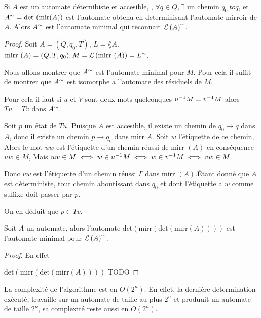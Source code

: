 \begin{prop}
	Si $A$ est un automate déternibiste et accesible, \ie, $\forall q \in Q, \exists \text{ un chemin } q_0 \ to q$,
	et  $A^{\sim} = \text {det } (\text {mir} (A)) $ est l'automate obtenu en determinisant l'automate mirroir de $A$. Alors
	$A^{\sim}$ est l'automate minimal qui reconnait $\mathcal{L}\left(A\right)^{\sim}$.
\end{prop}


\begin{proof}
	Soit $A = (Q, q_0, T)$, $L = \lang A$. $\text{mirr } (A) = (Q, T, q_0), M = \mathcal{L}\left(\text{mirr } (A)\right) = L^{\sim}$.

	Nous allons montrer que $A^{\sim}$ est l'automate minimal pour $M$. Pour cela il suffit de montrer que $A^{\sim}$
	est isomorphe a l'automate des résiduels de $M$.

	Pour cela il faut \mq si $u$ et $V$ sont deux mots quelconques \tq $u^{-1} M = v^{-1} M$ alors $T u =  T v$ dans $A^{\sim}$.

	Soit $p$ un état de $T u$. Puisque $A$ est accesible, il existe un chemin de $q_0 \to q$ dans $A$, donc il existe un chemin $p \to q_o$ dans $\text{mirr } A$.
	Soit $w$ l'étiquette de ce chemin, Alors le mot $uw$ est l'étiquette d'un chemin réussi de $\text{mirr }(A)$  en conséquence $uw \in M$,
	Mais $uw\in M \iff w \in u^{-1} M \iff w\in v^{-1} M \iff vw \in M$.

	Donc $vw$ est l'étiquette d'un chemin réussi $\Gamma$ dans $\text {mirr }(A)$.Étant donné que $A$ est déterministe, tout chemin aboutissant dans $q_0$
	et dont l'étiquette a $w$ comme suffixe doit passer par $p$.

	On en  déduit que $p \in Tv$.
\end{proof}


\begin{coro}
	Soit $A$ un automate, alors l'automate $\text {det} (\text{mirr} (\text{det}(\text{mirr} (A))))$ est l'automate minimal pour $\mathcal{L}\left(A\right)^{\sim}$.
\end{coro}

\begin{proof}
	En effet

	$\text {det} (\text{mirr} (\text{det}(\text{mirr} (A))))$  TODO
\end{proof}



La complexité de l'algorithme est en $O(2^n)$. En effet, la dernière determination exécuté, travaille sur un automate de taille au plus $2^n$
et produuit un automate de taille $2^n$, sa complexité reste aussi en $O(2^n)$.


